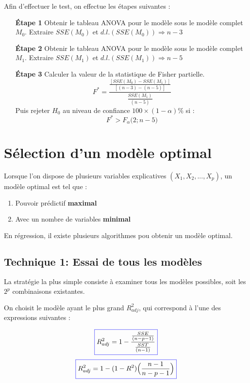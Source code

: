 \documentclass[11pt,french]{report}
\begin{document}
Afin d'effectuer le test, on effectue les étapes suivantes :
\begin{itemize}
\item[\textbf{Étape 1}] Obtenir le tableau ANOVA pour le modèle sous le modèle complet $M_0$. Extraire $SSE(M_0)$ et $d.l.(SSE(M_0)) \Rightarrow n - 3$

\item[\textbf{Étape 2}] Obtenir le tableau ANOVA pour le modèle sous le modèle complet $M_1$. Extraire $SSE(M_1)$ et $d.l.(SSE(M_1)) \Rightarrow n - 5$ 

\item[\textbf{Étape 3}] Calculer la valeur de la statistique de Fisher partielle.
$$
F^* = \frac{\frac{[SSE(M_0) - SSE(M_1)]}{[(n-3) - (n-5)]}}{\frac{SSE(M_1)}{(n-5)}}
$$
Puis rejeter $H_0$ au niveau de confiance $100 \times (1 - \alpha)\%$ si :
$$
F^* > F_{\alpha}\Big( 2; n-5 \Big)
$$
\end{itemize}

\section{Sélection d'un modèle optimal}
\label{sec:optimal}
Lorsque l'on dispose de plusieurs variables explicatives $(X_1,X_2,...,X_p)$, un modèle optimal est tel que :
\begin{enumerate}
\item Pouvoir prédictif \textbf{maximal}
\item Avec un nombre de variables \textbf{minimal}
\end{enumerate}

En régression, il existe plusieurs algorithmes pou obtenir un modèle optimal.

\subsection{Technique 1: Essai de tous les modèles}
\label{tech1}

La stratégie la plus simple consiste à examiner tous les modèles possibles, soit les $2^p$ combinaisons existantes. \newline

On choisit le modèle ayant le plus grand $R^2_{adj}$, qui correspond à l'une des expressions suivantes :

\begin{equation}
\color{blue}
\boxed{\color{black}
R^2_{adj} = 1 - \frac{\frac{SSE}{(n-p-1)}}{\frac{SST}{(n-1)}} 
}
\end{equation}
\begin{equation}
\color{blue}
\boxed{\color{black}
R^2_{adj} = 1 - (1 - R^2) \Big(\frac{n-1}{n-p-1} \Big) 
}
\end{equation}
\end{document}
